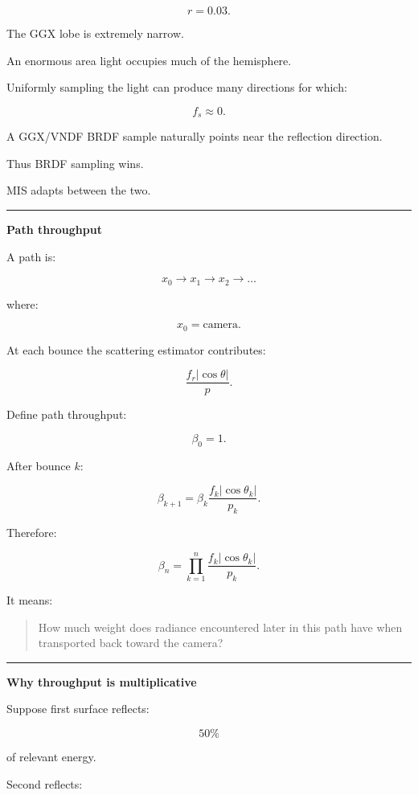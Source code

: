 \[
r=0.03.
\]

The GGX lobe is extremely narrow.

An enormous area light occupies much of the hemisphere.

Uniformly sampling the light can produce many directions for which:

\[
f_s\approx0.
\]

A GGX/VNDF BRDF sample naturally points near the reflection direction.

Thus BRDF sampling wins.

MIS adapts between the two.

\begin{center}\rule{0.5\linewidth}{0.5pt}\end{center}

\textbf{Path throughput}

A path is:

\[
x_0\rightarrow x_1\rightarrow x_2\rightarrow\dots
\]

where:

\[
x_0=\text{camera}.
\]

At each bounce the scattering estimator contributes:

\[
\frac{
f_r
|\cos\theta|
}{
p
}.
\]

Define path throughput:

\[
\boxed{
\beta_0=1.
}
\]

After bounce \(k\):

\[
\boxed{
\beta_{k+1}
=
\beta_k
\frac{
f_k|\cos\theta_k|
}{
p_k
}.
}
\]

Therefore:

\[
\boxed{
\beta_n
=
\prod_{k=1}^{n}
\frac{
f_k|\cos\theta_k|
}{
p_k
}.
}
\]

It means:

\begin{quote}
How much weight does radiance encountered later in this path have when transported back toward the camera?
\end{quote}

\begin{center}\rule{0.5\linewidth}{0.5pt}\end{center}

\textbf{Why throughput is multiplicative}

Suppose first surface reflects:

\[
50\%
\]

of relevant energy.

Second reflects:

